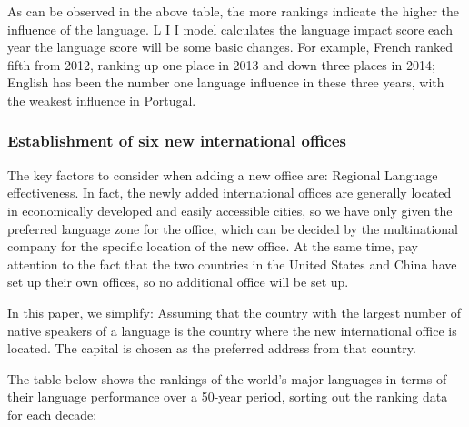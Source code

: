  As can be observed in the above table, the more rankings indicate the higher the influence of the language. L I I model calculates the language impact score each year the language score will be some basic changes. For example, French ranked fifth from 2012, ranking up one place in 2013 and down three places in 2014; English has been the number one language influence in these three years, with the weakest influence in Portugal.

\subsubsection{Establishment of six new international offices} 
\noindent The key factors to consider when adding a new office are: Regional Language effectiveness. In fact, the newly added international offices are generally located in economically developed and easily accessible cities, so we have only given the preferred language zone for the office, which can be decided by the multinational company for the specific location of the new office. At the same time, pay attention to the fact that the two countries in the United States and China have set up their own offices, so no additional office will be set up.
\par In this paper, we simplify: Assuming that the country with the largest number of native speakers of a language is the country where the new international office is located. The capital is chosen as the preferred address from that country.
\par The table below shows the rankings of the world's major languages in terms of their language performance over a 50-year period, sorting out the ranking data for each decade:

